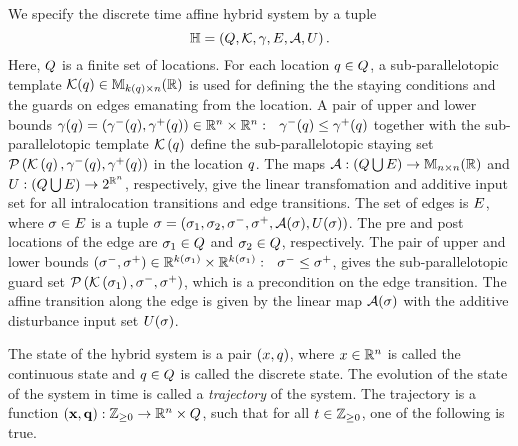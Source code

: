 We specify the discrete time affine hybrid system by a tuple 
%
\[
\mathbb{H} =
\left(Q,\mathcal{K},\gamma,E,\mathcal{A},U\right).
\]
%
Here, $Q$ is a finite set of locations.  For each location
$q\in Q$, a sub-parallelotopic template
$\mathcal{K}(q)\in\mathbb{M}_{k(q)\times n}(\mathbb{\mathbb{R}})$ is used for defining the
the staying conditions and the guards on edges emanating from the
location.  A pair of upper and lower bounds
$\gamma(q)=\left(\gamma^-(q),\gamma^+(q)\right)\in\mathbb{R}^n\times\mathbb{R}^n:
~~\gamma^-(q)\leq\gamma^+(q)$ together with the sub-parallelotopic
template $\mathcal{K}\left(q\right)$ define the
sub-parallelotopic staying set
$\mathcal{P}\left(\mathcal{K}\left(q\right),\gamma^-(q),\gamma^+(q)\right)$ in the
location $q$.  The maps
$\mathcal{A}:\left(Q\bigcup E\right)\rightarrow\mathbb{M}_{n\times n}(\mathbb{R})$
and $U:\left(Q\bigcup E\right)\rightarrow 2^{\mathbb{R}^n}$,
respectively, give the linear transfomation and additive input set for
all intralocation transitions and edge transitions.  The set of edges
is $E$, where $\sigma\in E$ is a tuple $\sigma =
\left(\sigma_{1},\sigma_{2},\sigma^-,\sigma^+,\mathcal{A}(\sigma),U(\sigma)\right)$.  The pre and post locations of the edge are
$\sigma_{1}\in Q$ and $\sigma_{2}\in Q$,
respectively.  The pair of upper and lower bounds
$\left(\sigma^-,\sigma^+\right)\in\mathbb{R}^{k\left(\sigma_{1}\right)}\times\mathbb{R}^{k\left(\sigma_{1}\right)}:~~\sigma^-\leq\sigma^+$,
gives the sub-parallelotopic guard set
$\mathcal{P}\left(\mathcal{K}\left(\sigma_{1}\right),\sigma^-,\sigma^+\right)$, which
is a precondition on the edge transition.  The affine transition along
the edge is given by the linear map $\mathcal{A}(\sigma)$ with the additive
disturbance input set $U(\sigma)$.

The state of the hybrid system is a pair $(x,q)$, where
$x\in\mathbb{R}^n$ is called the continuous state and
$q\in Q$ is called the discrete state.  The
evolution of the state of the system in time is called a
\emph{trajectory} of the system.  The trajectory is a function
$\left({\bf x},{\bf q}\right):\mathbb{Z}_{\geq 0}\rightarrow\mathbb{R}^n\times Q$, such
that for all $t\in\mathbb{Z}_{\geq 0}$, one of the following is true.


